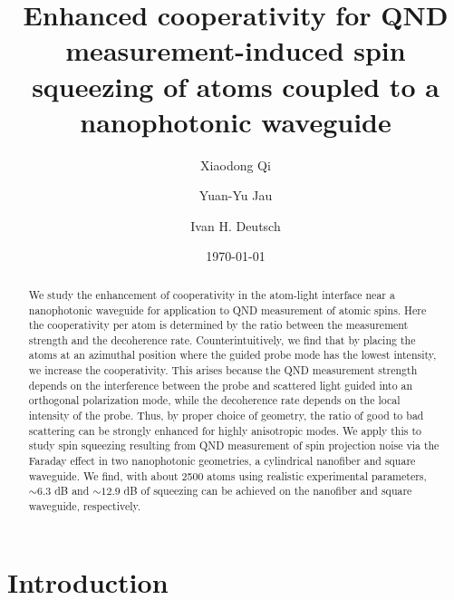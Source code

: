 \documentclass[preprint,aps,pra,onecolumn,superscriptaddress]{revtex4-1} %
\begin{document}
\title{Enhanced cooperativity for QND measurement-induced spin squeezing of atoms coupled to a nanophotonic waveguide}
\author{Xiaodong Qi}
\author{Yuan-Yu Jau}
\author{Ivan H. Deutsch}
\date{\today}

\begin{abstract}
We study the enhancement of cooperativity in the atom-light interface near a nanophotonic waveguide for application to QND measurement of atomic spins.  Here the cooperativity per atom is determined by the ratio between the  measurement strength and the decoherence rate.  Counterintuitively, we find that by placing the atoms at an azimuthal position where the guided probe mode has the lowest intensity, we increase the cooperativity.  This arises because the QND measurement strength depends on the interference between the probe and scattered light guided into an orthogonal polarization mode, while the decoherence rate depends on the local intensity of the probe.  Thus, by proper choice of geometry, the ratio of good to bad scattering can be strongly enhanced for highly anisotropic modes. We apply this to study spin squeezing resulting from QND measurement of spin projection noise via the Faraday effect in two nanophotonic geometries, a cylindrical nanofiber and square waveguide.  We find, with about 2500 atoms using realistic experimental parameters, $ \sim 6.3 $ dB and $ \sim 12.9 $ dB of squeezing can be achieved on the nanofiber and square waveguide, respectively. 
\end{abstract}

\maketitle

\section{Introduction}
\end{document}
